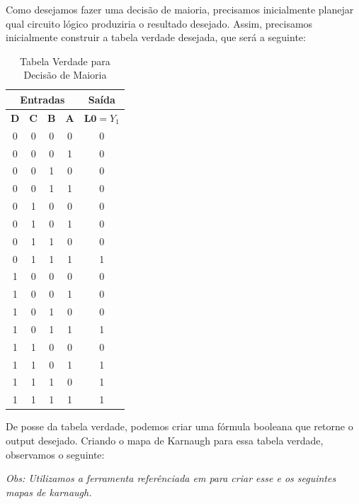 \documentclass[12pt]{article}
\begin{document}
Como desejamos fazer uma decisão de maioria, precisamos inicialmente planejar
qual circuito lógico produziria o resultado desejado. Assim, precisamos
inicialmente construir a tabela verdade desejada, que será a seguinte:

\begin{table}[H]
    \centering
    \caption{Tabela Verdade para Decisão de Maioria}
    \begin{tabular}{|c|c|c|c|c|}\hline
    \multicolumn{4}{|c|}{Entradas} & \multicolumn{1}{|c|}{Saída} \\\hline
    \textbf{D} & \textbf{C} & \textbf{B} & \textbf{A} & $\textbf{L0}=Y_{1}$ \\\hline
    0 & 0 & 0 & 0 & 0 \\\hline
    0 & 0 & 0 & 1 & 0 \\\hline
    0 & 0 & 1 & 0 & 0 \\\hline
    0 & 0 & 1 & 1 & 0 \\\hline
    0 & 1 & 0 & 0 & 0 \\\hline
    0 & 1 & 0 & 1 & 0 \\\hline
    0 & 1 & 1 & 0 & 0 \\\hline
    0 & 1 & 1 & 1 & 1 \\\hline
    1 & 0 & 0 & 0 & 0 \\\hline
    1 & 0 & 0 & 1 & 0 \\\hline
    1 & 0 & 1 & 0 & 0 \\\hline
    1 & 0 & 1 & 1 & 1 \\\hline
    1 & 1 & 0 & 0 & 0 \\\hline
    1 & 1 & 0 & 1 & 1 \\\hline
    1 & 1 & 1 & 0 & 1 \\\hline
    1 & 1 & 1 & 1 & 1 \\\hline
    \end{tabular}\label{tab:tabela_and}
\end{table}

De posse da tabela verdade, podemos criar uma fórmula booleana que retorne o
output desejado. Criando o mapa de Karnaugh para essa tabela verdade, observamos
o seguinte:

\emph{Obs: Utilizamos a ferramenta referênciada em \cite{karnaugh_generator} para
criar esse e os seguintes mapas de karnaugh.}
\end{document}

